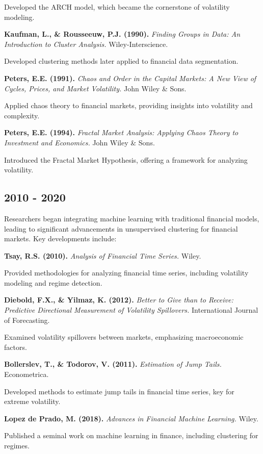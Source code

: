 Developed the ARCH model, which became the cornerstone of volatility modeling.

\textbf{Kaufman, L., \& Rousseeuw, P.J. (1990).} \textit{Finding Groups in Data: An Introduction to Cluster Analysis.} Wiley-Interscience.

Developed clustering methods later applied to financial data segmentation.

\textbf{Peters, E.E. (1991).} \textit{Chaos and Order in the Capital Markets: A New View of Cycles, Prices, and Market Volatility.} John Wiley \& Sons.

Applied chaos theory to financial markets, providing insights into volatility and complexity.

\textbf{Peters, E.E. (1994).} \textit{Fractal Market Analysis: Applying Chaos Theory to Investment and Economics.} John Wiley \& Sons.

Introduced the Fractal Market Hypothesis, offering a framework for analyzing volatility.

\subsection{2010 - 2020}
Researchers began integrating machine learning with traditional financial models, leading to significant advancements in unsupervised clustering for financial markets. Key developments include:

\textbf{Tsay, R.S. (2010).} \textit{Analysis of Financial Time Series.} Wiley.

Provided methodologies for analyzing financial time series, including volatility modeling and regime detection.

\textbf{Diebold, F.X., \& Yilmaz, K. (2012).} \textit{Better to Give than to Receive: Predictive Directional Measurement of Volatility Spillovers.} International Journal of Forecasting.

Examined volatility spillovers between markets, emphasizing macroeconomic factors.

\textbf{Bollerslev, T., \& Todorov, V. (2011).} \textit{Estimation of Jump Tails.} Econometrica.

Developed methods to estimate jump tails in financial time series, key for extreme volatility.

\textbf{Lopez de Prado, M. (2018).} \textit{Advances in Financial Machine Learning.} Wiley.

Published a seminal work on machine learning in finance, including clustering for regimes.


